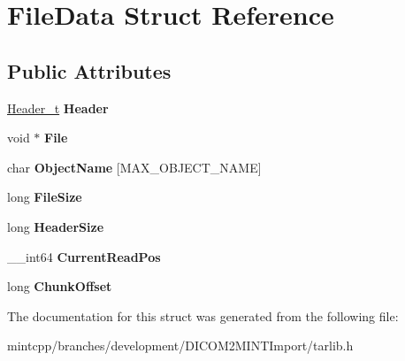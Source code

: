 \hypertarget{struct_file_data}{
\section{FileData Struct Reference}
\label{struct_file_data}
}
\subsection*{Public Attributes}
\begin{DoxyCompactItemize}
\item 
\hypertarget{struct_file_data_ab2b7393b17fc7e89b3f3c3fda90c27ac}{
\hyperlink{struct_header}{Header\_\-t} {\bfseries Header}}
\label{struct_file_data_ab2b7393b17fc7e89b3f3c3fda90c27ac}

\item 
\hypertarget{struct_file_data_ad30dc970854884e142a51aabc30fbd57}{
void $\ast$ {\bfseries File}}
\label{struct_file_data_ad30dc970854884e142a51aabc30fbd57}

\item 
\hypertarget{struct_file_data_aac299ef3fa345fef86762a5e48e7d83a}{
char {\bfseries ObjectName} \mbox{[}MAX\_\-OBJECT\_\-NAME\mbox{]}}
\label{struct_file_data_aac299ef3fa345fef86762a5e48e7d83a}

\item 
\hypertarget{struct_file_data_a43e051259f4a74a20282927cb4283f8e}{
long {\bfseries FileSize}}
\label{struct_file_data_a43e051259f4a74a20282927cb4283f8e}

\item 
\hypertarget{struct_file_data_aeed687e8bf25d6eb2a67b3d5b83149de}{
long {\bfseries HeaderSize}}
\label{struct_file_data_aeed687e8bf25d6eb2a67b3d5b83149de}

\item 
\hypertarget{struct_file_data_a37733067a5e6b01def08885a14c9b51f}{
\_\-\_\-int64 {\bfseries CurrentReadPos}}
\label{struct_file_data_a37733067a5e6b01def08885a14c9b51f}

\item 
\hypertarget{struct_file_data_a07c4d69da79e3b0e038ad193bd5bd47e}{
long {\bfseries ChunkOffset}}
\label{struct_file_data_a07c4d69da79e3b0e038ad193bd5bd47e}

\end{DoxyCompactItemize}


The documentation for this struct was generated from the following file:\begin{DoxyCompactItemize}
\item 
mintcpp/branches/development/DICOM2MINTImport/tarlib.h\end{DoxyCompactItemize}

